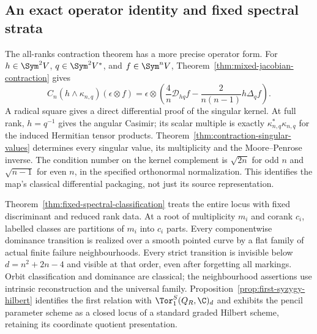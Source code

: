 \subsection{An exact operator identity and fixed spectral strata}

The all-ranks contraction theorem has a more precise operator form.
For \(h\in\Sym^2V\), \(q\in\Sym^2V^*\), and \(f\in\Sym^nV\),
Theorem~\ref{thm:mixed-jacobian-contraction} gives
\[
 C_n(h\wedge\kappa_{n,q})(\epsilon\otimes f)
 =\epsilon\otimes\left(\frac4n\mathcal D_{hq}f
 -\frac{2}{n(n-1)}h\Delta_q f\right).
\]
A radical square gives a direct differential proof of the singular
kernel. At full rank, \(h=q^{-1}\) gives the angular Casimir;
its scalar multiple is exactly \(\kappa_{n,q}^*\kappa_{n,q}\)
for the induced Hermitian tensor products.
Theorem~\ref{thm:contraction-singular-values} determines every
singular value, its multiplicity and the Moore--Penrose inverse.
The condition number on the kernel complement is \(\sqrt{2n}\)
for odd \(n\) and \(\sqrt{n-1}\) for even \(n\), in the
specified orthonormal normalization. This identifies the map's
classical differential packaging, not just its source representation.

Theorem~\ref{thm:fixed-spectral-classification} treats the entire
locus with fixed discriminant and reduced rank data. At a root of
multiplicity \(m_i\) and corank \(c_i\), labelled classes are
partitions of \(m_i\) into \(c_i\) parts. Every componentwise
dominance transition is realized over a smooth pointed curve by a
flat family of actual finite failure neighbourhoods. Every strict
transition is invisible below \(d=n^2+2n-4\) and visible at that
order, even after forgetting all markings. Orbit classification and
dominance are classical; the neighbourhood assertions use intrinsic
reconstruction and the universal family.
Proposition~\ref{prop:first-syzygy-hilbert} identifies the first
relation with \(\Tor_1^S(Q_R,\C)_d\) and exhibits the pencil
parameter scheme as a closed locus of a standard graded Hilbert
scheme, retaining its coordinate quotient presentation.
